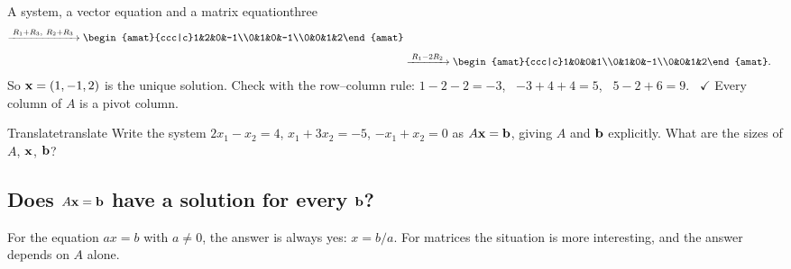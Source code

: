 \documentclass[11pt]{article}
\begin{document}
\begin{exmp}{A system, a vector equation and a matrix equation}{three}
\begin{align*}
\rops{R_1+R_3,\ R_2+R_3}
\begin{amat}{ccc|c}1&2&0&-1\\0&1&0&-1\\0&0&1&2\end{amat}\\[4pt]
&\rops{R_1-2R_2}
\begin{amat}{ccc|c}1&0&0&1\\0&1&0&-1\\0&0&1&2\end{amat}.
\end{align*}
So $\mathbf{x}=(1,-1,2)$ is the unique solution. Check with the row--column rule:
$1-2-2=-3$, \ $-3+4+4=5$, \ $5-2+6=9$. \ $\checkmark$ Every column of $A$ is a pivot column.
\end{exmp}
 
\begin{kc}{Translate}{translate}
Write the system $2x_1-x_2=4$, $x_1+3x_2=-5$, $-x_1+x_2=0$ as $A\mathbf{x}=\mathbf{b}$, giving $A$ and $\mathbf{b}$ explicitly. What are the sizes of $A$, $\mathbf{x}$, $\mathbf{b}$?
\end{kc}
 
\subsection*{Does $A\mathbf{x}=\mathbf{b}$ have a solution for every $\mathbf{b}$?}
 
For the equation $ax=b$ with $a\neq0$, the answer is always yes: $x=b/a$. For matrices the situation is more interesting,
and the answer depends on $A$ alone.
 
\end{document}
